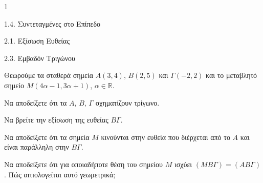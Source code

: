 \begin{ylh}{1}
    \item 1.4. Συντεταγμένες στο Επίπεδο
    \item 2.1. Εξίσωση Ευθείας
    \item 2.3. Εμβαδόν Τριγώνου
\end{ylh}
Θεωρούμε τα σταθερά σημεία $A(3,4)$, $B(2,5)$ και $\Gamma(-2,2)$ και το μεταβλητό σημείο $M(4\alpha-1, 3\alpha+1)$, $\alpha \in \mathbb{R}$.

\begin{alist}
\item Να αποδείξετε ότι τα $A$, $B$, $\Gamma$ σχηματίζουν τρίγωνο. 
\item Να βρείτε την εξίσωση της ευθείας $B\Gamma$. 
\item Να αποδείξετε ότι τα σημεία $M$ κινούνται στην ευθεία που διέρχεται από το $A$ και είναι παράλληλη στην $B\Gamma$. 
\item Να αποδείξετε ότι για οποιαδήποτε θέση του σημείου $M$ ισχύει $(MB\Gamma)=(AB\Gamma)$. Πώς αιτιολογείται αυτό γεωμετρικά; 
\end{alist}